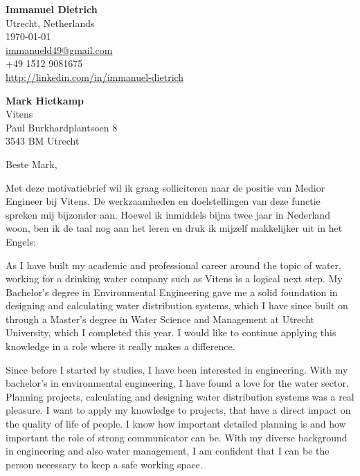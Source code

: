 \documentclass[11pt]{report}
\begin{document}
 
\begin{titlepage}

    \begin{minipage}[t]{0.95\textwidth}
        \hfill
        \raggedleft
        \textbf{Immanuel Dietrich} \\
        Utrecht, Netherlands \\
        \today\\
        \href{mailto:immanueld49@gmail.com}{immanueld49@gmail.com} \\
        +49 1512 9081675 \\
        \url{http://linkedin.com/in/immanuel-dietrich}
    \end{minipage}

\raggedright \textbf{Mark Hietkamp} \\ Vitens  \\ Paul Burkhardplantsoen 8 \\  3543 BM Utrecht \\ 

\vspace{0.7em}

\raggedright Beste Mark,\\


\vspace{0.7em}

Met deze motivatiebrief wil ik graag solliciteren naar de positie van Medior Engineer bij Vitens. De werkzaamheden en doelstellingen van deze functie spreken mij bijzonder aan. 
Hoewel ik inmiddels bijna twee jaar in Nederland woon, ben ik de taal nog aan het leren en druk ik mijzelf makkelijker uit in het Engels:

\vspace{0.7em}

As I have built my academic and professional career around the topic of water, working for a drinking water company such as Vitens is a logical next step. My Bachelor's degree in Environmental 
Engineering gave me a solid foundation in designing and calculating water distribution systems, which I have since built on through a Master's degree in Water Science and Management at Utrecht University, 
which I completed this year. I would like to continue applying this knowledge in a role where it really makes a difference.

\vspace{0.7em}

Since before I started by studies, I have been interested in engineering. With my bachelor's in environmental engineering, I have found a love for the water sector. Planning projects, calculating and designing water distribution systems was a real pleasure. 
I want to apply my knowledge to projects, that have a direct impact on the quality of life of people. I know how important detailed planning is and how important the role of strong communicator can be. With my diverse background in engineering and also 
water management, I am confident that I can be the person necessary to keep a safe working space. 


\end{titlepage}
\end{document}
